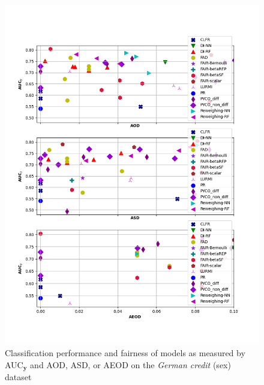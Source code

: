 \documentclass[preprint,12pt]{elsarticle}
\begin{document}
\begin{figure}
	\center
	\includegraphics[angle=0, width=1\textwidth]{Ger_sex_all.png}
	\captionsetup{justification=centering}
	\caption{Classification performance and fairness of models as measured by AUC$_\mathbf{y}$ and AOD, ASD, or AEOD on the \textit{German credit} (sex) dataset}
	\label{fig:Ger_sex all}
	\vskip -0.2in
\end{figure}
\fi
\end{document}

